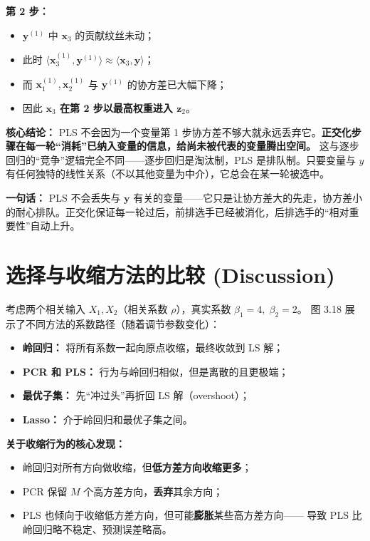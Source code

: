 \textbf{第 2 步：}
\begin{itemize}
    \item $\mathbf{y}^{(1)}$ 中 $\mathbf{x}_3$ 的贡献纹丝未动；
    \item 此时 $\langle \mathbf{x}_3^{(1)}, \mathbf{y}^{(1)} \rangle \approx \langle \mathbf{x}_3, \mathbf{y} \rangle$；
    \item 而 $\mathbf{x}_1^{(1)}, \mathbf{x}_2^{(1)}$ 与 $\mathbf{y}^{(1)}$ 的协方差已大幅下降；
    \item 因此 \textbf{$\mathbf{x}_3$ 在第 2 步以最高权重进入 $\mathbf{z}_2$}。
\end{itemize}

\textbf{核心结论：} PLS 不会因为一个变量第 1 步协方差不够大就永远丢弃它。\textbf{正交化步骤在每一轮``消耗''已纳入变量的信息，给尚未被代表的变量腾出空间。} 这与逐步回归的``竞争''逻辑完全不同——逐步回归是淘汰制，PLS 是排队制。只要变量与 $y$ 有任何独特的线性关系（不以其他变量为中介），它总会在某一轮被选中。

\textbf{一句话：} PLS 不会丢失与 $\mathbf{y}$ 有关的变量——它只是让协方差大的先走，协方差小的耐心排队。正交化保证每一轮过后，前排选手已经被消化，后排选手的``相对重要性''自动上升。

\section{选择与收缩方法的比较 (Discussion)}

考虑两个相关输入 $X_1, X_2$（相关系数 $\rho$），真实系数 $\beta_1=4,\; \beta_2=2$。
图 3.18 展示了不同方法的系数路径（随着调节参数变化）：

\begin{itemize}
    \item \textbf{岭回归：} 将所有系数一起向原点收缩，最终收敛到 LS 解；
    \item \textbf{PCR 和 PLS：} 行为与岭回归相似，但是离散的且更极端；
    \item \textbf{最优子集：} 先``冲过头''再折回 LS 解（overshoot）；
    \item \textbf{Lasso：} 介于岭回归和最优子集之间。
\end{itemize}

\textbf{关于收缩行为的核心发现：}
\begin{itemize}
    \item 岭回归对所有方向做收缩，但\textbf{低方差方向收缩更多}；
    \item PCR 保留 $M$ 个高方差方向，\textbf{丢弃}其余方向；
    \item PLS 也倾向于收缩低方差方向，但可能\textbf{膨胀}某些高方差方向——
    导致 PLS 比岭回归略不稳定、预测误差略高。
\end{itemize}

